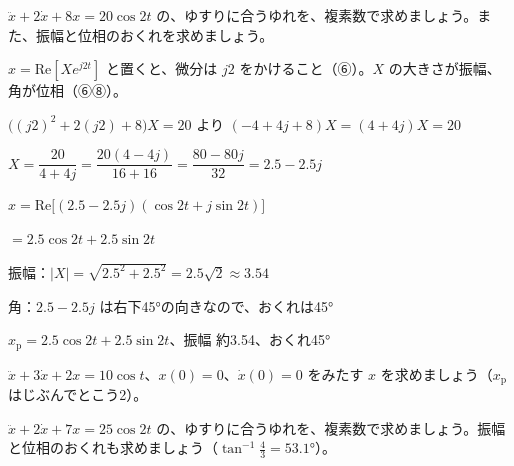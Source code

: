 \begin{reidai}[複素数で求める]
$\ddot x+2\dot x+8x=20\cos2t$ の、ゆすりに合うゆれを、複素数で求めましょう。また、振幅と位相のおくれを求めましょう。\par
\kangaekata $x=\mathrm{Re}[Xe^{j2t}]$ と置くと、微分は $j2$ をかけること（⑥）。$X$ の大きさが振幅、角が位相（⑥⑧）。\par
\shiki $\bigl((j2)^2+2(j2)+8\bigr)X=20$ より $(-4+4j+8)X=(4+4j)X=20$\par
\bkvinq $X=\dfrac{20}{4+4j}=\dfrac{20(4-4j)}{16+16}=\dfrac{80-80j}{32}=2.5-2.5j$\par
\bkvinq $x=\mathrm{Re}\bigl[(2.5-2.5j)(\cos2t+j\sin2t)\bigr]$\par
\bkvinq \phantom{$x$}${}=2.5\cos2t+2.5\sin2t$\par
\bkvinq 振幅：$\lvert X\rvert=\sqrt{2.5^2+2.5^2}=2.5\sqrt2\approx3.54$\par
\bkvinq 角：$2.5-2.5j$ は右下45°の向きなので、おくれは45°\par
\kotae $x_{\mathrm p}=2.5\cos2t+2.5\sin2t$、振幅 約3.54、おくれ45°
\end{reidai}

\noindent\begin{minipage}[t]{0.485\linewidth}\vspace{0pt}
\begin{jibun}\raggedright
$\ddot x+3\dot x+2x=10\cos t$、$x(0)=0$、$\dot x(0)=0$ をみたす $x$ を求めましょう（$x_{\mathrm p}$ はじぶんでとこう2）。
\end{jibun}
\end{minipage}\hfill
\begin{minipage}[t]{0.485\linewidth}\vspace{0pt}
\begin{jibun}\raggedright
$\ddot x+2\dot x+7x=25\cos2t$ の、ゆすりに合うゆれを、複素数で求めましょう。振幅と位相のおくれも求めましょう（$\tan^{-1}\frac43=53.1°$）。
\end{jibun}
\end{minipage}

